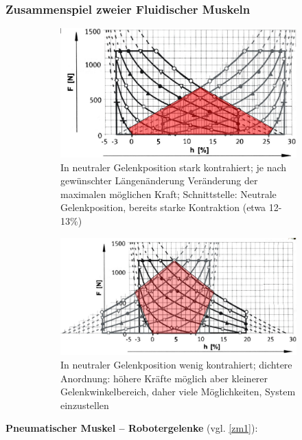 \subsubsection{Zusammenspiel zweier Fluidischer Muskeln}
\begin{figure}[h!]
	\centering
	\begin{subfigure}{.5\textwidth}
		\includegraphics[width=\linewidth]{figures/ch03_zusammenspiel.png}
		\caption{In neutraler Gelenkposition stark kontrahiert; je nach gewünschter Längenänderung Veränderung der maximalen möglichen Kraft; Schnittstelle: Neutrale Gelenkposition, bereits starke Kontraktion (etwa 12-13\%)}
	\end{subfigure}
	\begin{subfigure}{.5\textwidth}
		\includegraphics[width=\linewidth]{figures/ch03_zusammenspiel1.png}
		\caption{In neutraler Gelenkposition wenig kontrahiert; dichtere Anordnung: höhere Kräfte möglich aber kleinerer Gelenkwinkelbereich, daher viele Möglichkeiten, System einzustellen}
	\end{subfigure}
	\caption{}
	\label{zsspiel}
\end{figure}
\textbf{Pneumatischer Muskel -- Robotergelenke} (vgl. \autoref{zm1}):
